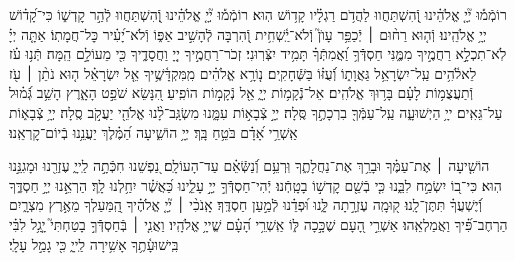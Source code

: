 \documentclass[twoside, openany, parskip=half, 11pt]{book}
\begin{document}
\newcommand{\negline}{\vspace{-\baselineskip}}

\negline

%
רוֹמְֿמ֡וּ יְ֘יָ֤ אֱלֹהֵ֗ינוּ וְֽֿ֭הִשְׁתַּחֲווּ לַהֲדֹ֥ם רַגְלָ֗יו קָד֥וֹשׁ הֽוּא׃ 
רוֹמְֿמ֡וּ יְ֘יָ֤ אֱלֹהֵ֗ינוּ וְֽֿ֭הִשְׁתַּחֲווּ לְֿהַ֣ר קׇדְשׁ֑וֹ כִּי־קָ֝ד֗וֹשׁ יְיָ֥ אֱלֹהֵֽינוּ׃ 
%
וְֿה֤וּא רַח֨וּם ׀ יְֿכַפֵּ֥ר עָוֺן֮ וְֽֿלֹא־יַֽ֫שְׁחִ֥ית וְֿ֭הִרְבָּה לְֿהָשִׁ֣יב אַפּ֑וֹ 
וְֿלֹא־יָ֝עִ֗יר כׇּל־חֲמָתֽוֹ׃ 
%
אַתָּ֤ה יְיָ֗ לֹֽא־תִכְלָ֣א רַחֲמֶ֣יךָ מִמֶּ֑נִּי חַסְדְּֿֿךָ֥ וַ֝אֲמִתְּֿךָ֗ תָּמִ֥יד יִצְּֿרֽוּנִי׃ 
זְכֹר־רַחֲמֶ֣יךָ יְיָ֭ וַחֲסָדֶ֑יךָ כִּ֖י מֵעוֹלָ֣ם הֵֽמָּה׃ 
תְּֿנ֥וּ עֹ֗ז לֵאלֹ֫הִ֥ים עַֽל־יִשְׂרָאֵ֥ל גַּאֲוָת֑וֹ וְֿ֝עֻזּ֗וֹ בַּשְּֿׁחָקִֽים׃ 
נ֤וֹרָ֥א אֱלֹהִ֗ים מִֽמִּקְדָּ֫שֶׁ֥יךָ אֵ֤ל יִשְׂרָאֵ֗ל 
ה֤וּא נֹתֵ֨ן ׀ עֹ֖ז וְֿתַעֲצֻמ֥וֹת לָעָ֗ם בָּר֥וּךְ אֱלֹהִֽים׃ 
אֵל־נְֿֿקָמ֥וֹת יְיָ֑ אֵ֖ל נְֿקָמ֣וֹת הוֹפִֽיעַ׃ 
הִ֭נָּשֵׂא שֹׁפֵ֣ט הָאָ֑רֶץ הָשֵׁ֥ב גְּֿ֝מ֗וּל עַל־גֵּאִֽים׃ 
ייָ֥ הַיְשׁוּעָ֑ה עַֽל־עַמְּֿךָ֖ בִרְכָתֶ֣ךָ סֶּֽלָה׃ 
 יְיָ֣ צְֿבָא֣וֹת עִמָּ֑נוּ מִשְׂגָּֽב־לָ֨נוּ אֱלֹהֵ֖י יַעֲקֹ֣ב סֶֽלָה׃ 
 יְיָ֥ צְֿבָא֑וֹת אַֽשְׁרֵ֥י אָ֝דָ֗ם בֹּטֵ֥חַ בָּֽךְ׃ 
 יְיָ֥ הוֹשִׁ֑יעָה הַ֝מֶּ֗לֶךְ יַעֲנֵ֥נוּ בְֿיוֹם־קׇרְאֵֽנוּ׃ 

הוֹשִׁ֤יעָה ׀ אֶת־עַמֶּ֗ךָ וּבָרֵ֥ךְ אֶת־נַחֲלָתֶ֑ךָ וּֽרְעֵ֥ם וְֿ֝נַשְּֿׂאֵ֗ם עַד־הָעוֹלָֽם׃ 
נַ֭פְשֵׁנוּ חִכְּֿתָ֣ה לַֽייָ֑ עֶזְרֵ֖נוּ וּמָגִנֵּ֣נוּ הֽוּא׃
כִּי־ב֭וֹ יִשְׂמַ֣ח לִבֵּ֑נוּ כִּ֤י בְֿשֵׁ֖ם קׇדְשׁ֣וֹ בָטָֽחְֿנוּ׃ 
יְֿהִי־חַסְדְּֿֿךָ֣ יְיָ֣ עָלֵ֑ינוּ כַּ֝אֲשֶׁ֗ר יִחַ֥לְנוּ לָֽךְ׃ 
הַרְאֵ֣נוּ יְיָ֣ חַסְדֶּ֑ךָ וְֿ֝יֶשְׁעֲךָ֗ תִּתֶּן־לָֽנוּ׃ 
ק֭וּמָֽה עֶזְרָ֣תָה לָּ֑נוּ וּ֝פְדֵ֗נוּ לְֿמַ֣עַן חַסְדֶּֽךָ׃ 
אָֽנֹכִ֨י ׀ יְ֘יָ֤ אֱלֹהֶ֗יךָ הַֽ֭מַּעַלְךָ מֵאֶ֣רֶץ מִצְרָ֑יִם הַרְחֶב־פִּ֗֝יךָ וַאֲמַלְאֵֽהוּ׃ 
אַשְׁרֵ֣י הָ֭עָם שֶׁכָּ֣כָה לּ֑וֹ אַֽשְׁרֵ֥י הָ֝עָ֗ם שֱׁייָ֥ אֱלֹהָֽיו׃ 
וַאֲנִ֤י ׀ בְּֿחַסְדְּֿֿךָ֣ בָטַחְתִּי֮ יָ֤גֵ֥ל לִבִּ֗י בִּֽישׁוּעָ֫תֶ֥ךָ אָשִׁ֥ירָה לַֽייָ֑ כִּ֖י גָמַ֣ל עָלָֽי׃ 

\negline
\end{document}

